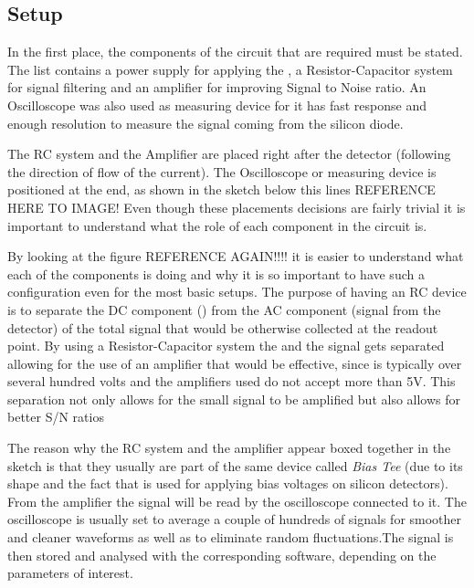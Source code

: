 
\subsection{Setup} %

In the first place, the components of the circuit that are required must be stated. The list contains a power supply for applying the \vias, a Resistor-Capacitor system for signal filtering and an amplifier for improving Signal to Noise ratio. An Oscilloscope was also used as measuring device for it has fast response and enough resolution to measure the signal coming from the silicon diode.

The RC system and the Amplifier are placed right after the detector (following the direction of flow of the current). The Oscilloscope or measuring device is positioned at the end, as shown in the sketch below this lines REFERENCE HERE TO IMAGE! Even though these placements decisions are fairly trivial it is important to understand what the role of each component in the circuit is.

By looking at the figure REFERENCE AGAIN!!!! it is easier to understand what each of the components is doing and why it is so important to have such a configuration even for the most basic setups. The purpose of having an RC device is to separate the DC component (\vias) from the AC component (signal from the detector) of the total signal that would be otherwise collected at the readout point. By using a Resistor-Capacitor system the \vias and the signal gets separated allowing for the use of an amplifier that would be effective, since \vias is typically over several hundred volts and the amplifiers used do not accept more than 5V. This separation not only allows for the small signal to be amplified but also allows for better S/N ratios 

The reason why the RC system and the amplifier appear boxed together in the sketch is that they usually are part of the same device called \textit{Bias Tee} (due to its shape and the fact that is used for applying bias voltages on silicon detectors). From the amplifier the signal will be read by the oscilloscope connected to it. The oscilloscope is usually set to average a couple of hundreds of signals for smoother and cleaner waveforms as well as to eliminate random fluctuations.The signal is then stored and analysed with the corresponding software, depending on the parameters of interest.


